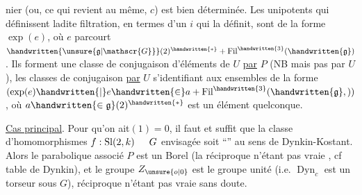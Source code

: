 nier (ou, ce qui revient au même, $c$) est bien déterminée. Les unipotents qui définissent ladite filtration, en termes d'un $i$ qui la définit, sont de la forme $\exp(e)$, où $e$ parcourt $\handwritten{\unsure{\mathfrak{g}|\mathscr{G}}}(2)^{\handwritten{*}}+\operatorname{Fil}^{\handwritten{3}}(\handwritten{\mathfrak{g}})$. Ils forment une classe de conjugaison d'éléments de $U$ \uline{par} $P$ (NB mais pas par $U$), les classes de conjugaison \uline{par} $U$ s'identifiant aux ensembles de la forme $(\exp(e)\handwritten{\mid}e\handwritten{\in}a+\operatorname{Fil}^{\handwritten{3}}(\handwritten{\mathfrak{g}},))$, où $a\handwritten{\in\mathfrak{g}}(2)^{\handwritten{*}}$ est un élément quelconque.

\uline{Cas principal}. Pour qu'on ait\hspace{1.5em}$(1)=0$, il faut et suffit que  la classe d'homomorphismes $f:\operatorname{Sl}(2,k)\hspace{1.5em}G$ envisagée soit ``'' au sens de Dynkin-Kostant. Alors le parabolique associé $P$ est un Borel (la réciproque n'étant pas vraie , cf table de Dynkin), et le groupe $Z_{\unsure{o|0}}$ est le groupe unité (i.e. $\operatorname{Dyn}_c$ est un torseur sous $G$),  réciproque n'étant pas vraie sans doute.

